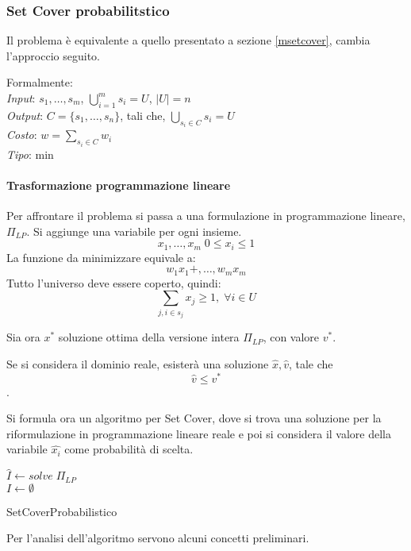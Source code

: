 \subsubsection{Set Cover probabilitstico}
Il problema è equivalente a quello presentato a sezione \ref{msetcover}, cambia
l'approccio seguito.

Formalmente: \\
\emph{Input}: $s_1, \dots, s_m$, $\bigcup_{i=1}^m s_i = U$, $|U| = n$\\
\emph{Output}: $C = \{s_1, \dots, s_n\}$, tali che, $\bigcup_{s_i \in C} s_i = U$\\
\emph{Costo}: $w = \sum_{s_i \in C} w_i$\\
\emph{Tipo}: min

\paragraph{Trasformazione programmazione lineare}
Per affrontare il problema si passa a una formulazione in programmazione lineare, $\Pi_{LP}$.
Si aggiunge una variabile per ogni insieme.
$$x_1, \dots, x_m \;0 \leq x_i\leq 1$$
La funzione da minimizzare equivale a:
$$w_1 x_1 +, \dots, w_m x_m $$
Tutto l'universo deve essere coperto, quindi:
$$\sum_{j, i\in s_j} x_j \geq 1, \; \forall i \in U$$

Sia ora $x^*$ soluzione ottima della versione intera $\Pi_{LP}$, con valore 
$v^*$.

Se si considera il dominio reale, esisterà una soluzione $\hat{x}, \hat{v}$, 
tale che $$\hat{v}\leq v^*$$.

Si formula ora un algoritmo per Set Cover, dove si trova una soluzione 
per la riformulazione in programmazione lineare reale e poi si considera il valore della
variabile $\hat{x_i}$ come probabilità di scelta.

\begin{algorithm}[H]
    \SetAlgoLined
    $\hat{I} \gets \mathit{solve} \; \Pi_{LP}$\\
    $I \gets \emptyset$\\
     \caption{SetCoverProbabilistico}
\end{algorithm}

Per l'analisi dell'algoritmo servono alcuni concetti preliminari.

